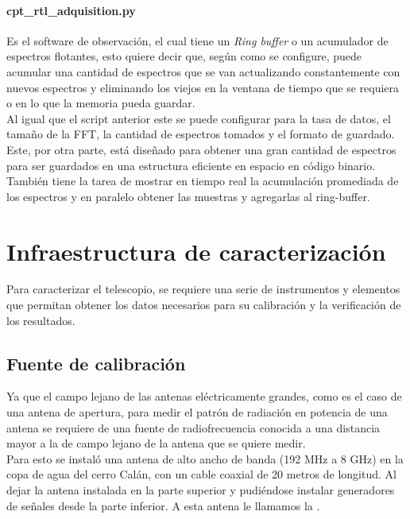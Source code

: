 \paragraph{cpt\_rtl\_adquisition.py} Es el software de observación, el cual tiene un \textit{Ring buffer} o un acumulador de espectros flotantes, esto quiere decir que, según como se configure, puede acumular una cantidad de espectros que se van actualizando constantemente con nuevos espectros y eliminando los viejos en la ventana de tiempo que se requiera o en lo que la memoria pueda guardar.\\

Al igual que el script anterior este se puede configurar para la tasa de datos, el tamaño de la FFT, la cantidad de espectros tomados y el formato de guardado. Este, por otra parte, está diseñado para obtener una gran cantidad de espectros para ser guardados en una estructura eficiente en espacio en código binario. También tiene la tarea de mostrar en tiempo real la acumulación promediada de los espectros y en paralelo obtener las muestras y agregarlas al ring-buffer.\\


\section{Infraestructura de caracterización}

Para caracterizar el telescopio, se requiere una serie de instrumentos y elementos que permitan obtener los datos necesarios para su calibración y la verificación de los resultados.\\

\subsection{Fuente de calibración}

Ya que el campo lejano de las antenas eléctricamente grandes, como es el caso de una antena de apertura, para medir el patrón de radiación en potencia de una antena se requiere de una fuente de radiofrecuencia conocida a una distancia mayor a la de campo lejano de la antena que se quiere medir.\\

Para esto se instaló una antena de alto ancho de banda (192 MHz a 8 GHz) en la copa de agua del cerro Calán, con un cable coaxial de 20 metros de longitud. Al dejar la antena instalada en la parte superior y pudiéndose instalar generadores de señales desde la parte inferior. A esta antena le llamamos la .\\

